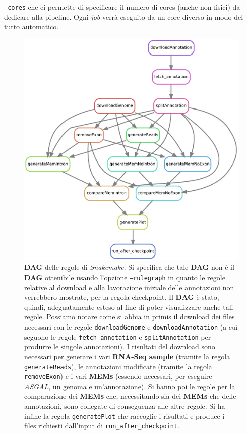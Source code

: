 \documentclass[a4paper,12pt, oneside]{book}
\begin{document}
\texttt{--cores} che ci permette di specificare il numero di cores (anche non
fisici) da dedicare alla pipeline. Ogni \textit{job} verrà eseguito da un core
diverso in modo del tutto automatico. 
\begin{figure}
  \centering
  \includegraphics[scale = 0.55]{img/graph.jpg}
  \caption{\textbf{DAG} delle regole di \textit{Snakemake}. Si specifica che
    tale \textbf{DAG} non è il \textbf{DAG} ottenibile usando l'opzione
    \texttt{--rulegraph} in quanto le regole relative al download e alla
    lavorazione iniziale delle 
    annotazioni non verrebbero mostrate, per la regola
    checkpoint. Il \textbf{DAG} è stato, quindi, adeguatamente esteso al fine
    di poter visualizzare anche tali regole. Possiamo notare
    come si abbia in primis il download dei files necessari con le regole
    \texttt{downloadGenome} e \texttt{downloadAnnotation} (a cui seguono le
    regole \texttt{fetch\_annotation} e \texttt{splitAnnotation} per produrre le
    singole annotazioni). I risultati del download sono necessari per
    generare i vari \textbf{RNA-Seq sample} (tramite la regola
    \texttt{generateReads}), le annotazioni modificate (tramite la regola
    \texttt{removeExon}) e i vari \textbf{MEMs} (essendo necessari, per
    eseguire \textit{ASGAL}, un genoma e un'annotazione). Si hanno poi le regole
    per la comparazione dei \textbf{MEMs} che, necessitando sia dei
    \textbf{MEMs} che delle annotazioni, sono collegate di conseguenza alle
    altre regole. Si ha infine la regola \texttt{generatePlot} che raccoglie i 
    risultati e produce i files richiesti dall'input di
    \texttt{run\_after\_checkpoint}.}
  \label{rul}
\end{figure}
\end{document}
